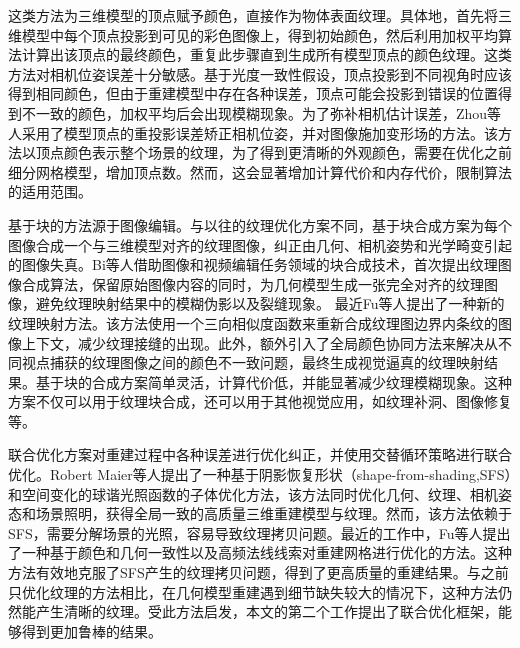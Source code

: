 \vspace*{2mm}这类方法为三维模型的顶点赋予颜色，直接作为物体表面纹理。具体地，首先将三维模型中每个顶点投影到可见的彩色图像上，得到初始颜色，然后利用加权平均算法计算出该顶点的最终颜色，重复此步骤直到生成所有模型顶点的颜色纹理。这类方法对相机位姿误差十分敏感。基于光度一致性假设，顶点投影到不同视角时应该得到相同颜色，但由于重建模型中存在各种误差，顶点可能会投影到错误的位置得到不一致的颜色，加权平均后会出现模糊现象。为了弥补相机估计误差，Zhou等人采用了模型顶点的重投影误差矫正相机位姿，并对图像施加变形场的方法。该方法以顶点颜色表示整个场景的纹理，为了得到更清晰的外观颜色，需要在优化之前细分网格模型，增加顶点数。然而，这会显著增加计算代价和内存代价，限制算法的适用范围。\par



\vspace*{2mm}基于块的方法源于图像编辑。与以往的纹理优化方案不同，基于块合成方案为每个图像合成一个与三维模型对齐的纹理图像，纠正由几何、相机姿势和光学畸变引起的图像失真。Bi等人借助图像和视频编辑任务领域的块合成技术，首次提出纹理图像合成算法，保留原始图像内容的同时，为几何模型生成一张完全对齐的纹理图像，避免纹理映射结果中的模糊伪影以及裂缝现象。
最近Fu等人提出了一种新的纹理映射方法。该方法使用一个三向相似度函数来重新合成纹理图边界内条纹的图像上下文，减少纹理接缝的出现。此外，额外引入了全局颜色协同方法来解决从不同视点捕获的纹理图像之间的颜色不一致问题，最终生成视觉逼真的纹理映射结果。基于块的合成方案简单灵活，计算代价低，并能显著减少纹理模糊现象。这种方案不仅可以用于纹理块合成，还可以用于其他视觉应用，如纹理补洞、图像修复等。\par

\vspace*{2mm}联合优化方案对重建过程中各种误差进行优化纠正，并使用交替循环策略进行联合优化。Robert Maier等人提出了一种基于阴影恢复形状（shape-from-shading,SFS）和空间变化的球谐光照函数的子体优化方法，该方法同时优化几何、纹理、相机姿态和场景照明，获得全局一致的高质量三维重建模型与纹理。然而，该方法依赖于SFS，需要分解场景的光照，容易导致纹理拷贝问题。最近的工作中，Fu等人提出了一种基于颜色和几何一致性以及高频法线线索对重建网格进行优化的方法。这种方法有效地克服了SFS产生的纹理拷贝问题，得到了更高质量的重建结果。与之前只优化纹理的方法相比，在几何模型重建遇到细节缺失较大的情况下，这种方法仍然能产生清晰的纹理。受此方法启发，本文的第二个工作提出了联合优化框架，能够得到更加鲁棒的结果。\par


